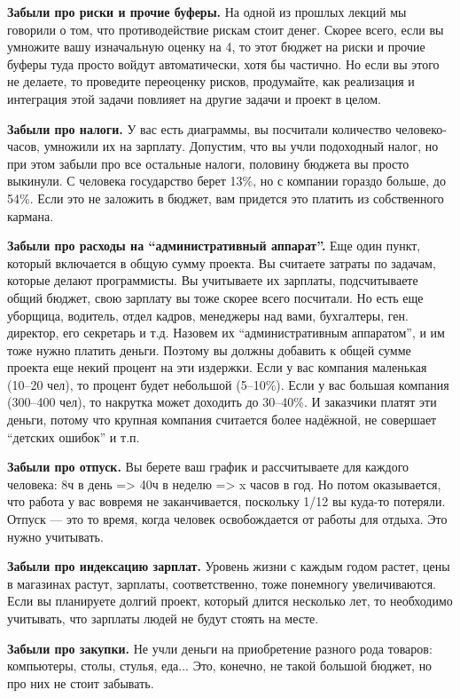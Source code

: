 \documentclass{../../text-style}
\begin{document}
\textbf{Забыли про риски и прочие буферы.} На одной из прошлых лекций мы говорили о том, что противодействие рискам стоит денег. Скорее всего, если вы умножите вашу изначальную оценку на 4, то этот бюджет на риски и прочие буферы туда просто войдут автоматически, хотя бы частично. Но если вы этого не делаете, то проведите переоценку рисков, продумайте, как реализация и интеграция этой задачи повлияет на другие задачи и проект в целом.

\textbf{Забыли про налоги.} У вас есть диаграммы, вы посчитали количество человеко-часов, умножили их на зарплату. Допустим, что вы учли подоходный налог, но при этом забыли про все остальные налоги, половину бюджета вы просто выкинули. С человека государство берет 13\%, но с компании гораздо больше, до 54\%. Если это не заложить в бюджет, вам придется это платить из собственного кармана.

\textbf{Забыли про расходы на \enquote{административный аппарат}.} Еще один пункт, который включается в общую сумму проекта. Вы считаете затраты по задачам, которые делают программисты. Вы учитываете их зарплаты, подсчитываете общий бюджет, свою зарплату вы тоже скорее всего посчитали. Но есть еще уборщица, водитель, отдел кадров, менеджеры над вами, бухгалтеры, ген. директор, его секретарь и т.д. Назовем их \enquote{административным аппаратом}, и им тоже нужно платить деньги. Поэтому вы должны добавить к общей сумме проекта еще некий процент на эти издержки. Если у вас компания маленькая (10–20 чел), то процент будет небольшой (5–10\%). Если у вас большая компания (300–400 чел), то накрутка может доходить до 30–40\%. И заказчики платят эти деньги, потому что крупная компания считается более надёжной, не совершает \enquote{детских ошибок} и т.п.

\textbf{Забыли про отпуск.} Вы берете ваш график и рассчитываете для каждого человека: 8ч в день => 40ч в неделю => x часов в год. Но потом оказывается, что работа у вас вовремя не заканчивается, поскольку 1/12 вы куда-то потеряли. Отпуск --- это то время, когда человек освобождается от работы для отдыха. Это нужно учитывать.

\textbf{Забыли про индексацию зарплат.} Уровень жизни с каждым годом растет, цены в магазинах растут, зарплаты, соответственно, тоже понемногу увеличиваются. Если вы планируете долгий проект, который длится несколько лет, то необходимо учитывать, что зарплаты людей не будут стоять на месте. 

\textbf{Забыли про закупки.} Не учли деньги на приобретение разного рода товаров: компьютеры, столы, стулья, еда... Это, конечно, не такой большой бюджет, но про них не стоит забывать.
\end{document}
